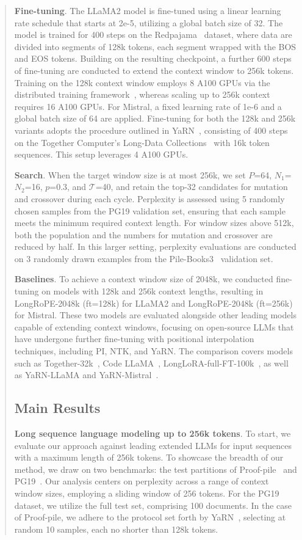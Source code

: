 \begin{abstract}
\textbf{Fine-tuning}. The LLaMA2 model is fine-tuned using a linear learning rate schedule that starts at 2e-5, utilizing a global batch size of 32. The model is trained for 400 steps on the Redpajama~\cite{redpajama} dataset, where data are divided into segments of 128k tokens, each segment wrapped with the BOS and EOS tokens. Building on the resulting checkpoint, a further 600 steps of fine-tuning are conducted to extend the context window to 256k tokens. Training on the 128k context window employs 8 A100 GPUs via the distributed training framework~\cite{cube}, whereas scaling up to 256k context requires 16 A100 GPUs. For Mistral, a fixed learning rate of 1e-6 and a global batch size of 64 are applied. Fine-tuning for both the 128k and 256k variants adopts the procedure outlined in YaRN~\cite{yarn}, consisting of 400 steps on the Together Computer's Long-Data Collections~\cite{mistraldata} with 16k token sequences. This setup leverages 4 A100 GPUs.

\textbf{Search}. When the target window size is at most 256k, we set $P$=64, $N_1$=$N_2$=16, $p$=0.3, and $\mathcal{T}$=40, and retain the top-32 candidates for mutation and crossover during each cycle. Perplexity is assessed using 5 randomly chosen samples from the PG19 validation set, ensuring that each sample meets the minimum required context length. For window sizes above 512k, both the population and the numbers for mutation and crossover are reduced by half. In this larger setting, perplexity evaluations are conducted on 3 randomly drawn examples from the Pile-Books3~\cite{pile} validation set.

\textbf{Baselines}. To achieve a context window size of 2048k, we conducted fine-tuning on models with 128k and 256k context lengths, resulting in LongRoPE-2048k (ft=128k) for LLaMA2 and LongRoPE-2048k (ft=256k) for Mistral. These two models are evaluated alongside other leading models capable of extending context windows, focusing on open-source LLMs that have undergone further fine-tuning with positional interpolation techniques, including PI, NTK, and YaRN. The comparison covers models such as Together-32k~\cite{together}, Code LLaMA~\cite{codellama}, LongLoRA-full-FT-100k~\cite{longlora}, as well as YaRN-LLaMA and YaRN-Mistral~\cite{yarn}.

\subsection{Main Results}

\label{sec:mainresult}
\textbf{Long sequence language modeling up to 256k tokens}. To start, we evaluate our approach against leading extended LLMs for input sequences with a maximum length of 256k tokens. To showcase the breadth of our method, we draw on two benchmarks: the test partitions of Proof-pile~\cite{pg19} and PG19~\cite{pile}. Our analysis centers on perplexity across a range of context window sizes, employing a sliding window of 256 tokens. For the PG19 dataset, we utilize the full test set, comprising 100 documents. In the case of Proof-pile, we adhere to the protocol set forth by YaRN~\cite{yarn}, selecting at random 10 samples, each no shorter than 128k tokens.


\end{abstract}
